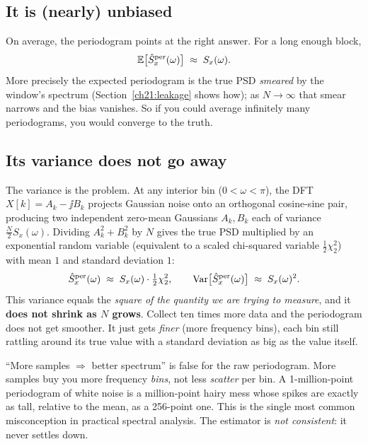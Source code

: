 \subsection{It is (nearly) unbiased}

On average, the periodogram points at the right answer. For a long enough block,
\[
\operatorname{\mathbb{E}}\!\big[\hat{S}^{\text{per}}_x(\omega)\big] \;\approx\; S_x(\omega).
\]
More precisely the expected periodogram is the true PSD \emph{smeared} by the
window's spectrum (Section~\ref{ch21:leakage} shows how); as
$N\to\infty$ that smear narrows and the bias vanishes. So if you could average
infinitely many periodograms, you would converge to the truth.

\subsection{Its variance does not go away}

The variance is the problem. At any interior bin ($0 < \omega < \pi$), the DFT $X[k] = A_k - \jj B_k$ projects Gaussian noise onto an orthogonal cosine-sine pair, producing two independent zero-mean Gaussians $A_k, B_k$ each of variance $\tfrac{N}{2}S_x(\omega)$. Dividing $A_k^2 + B_k^2$ by $N$ gives the true PSD multiplied by an exponential random variable (equivalent to a scaled chi-squared variable $\tfrac12\chi^2_2$) with mean $1$ and standard deviation $1$:
\[
\hat{S}^{\text{per}}_x(\omega) \;\approx\; S_x(\omega)\cdot \tfrac12\chi^2_2,
\qquad \operatorname{Var}\!\big[\hat{S}^{\text{per}}_x(\omega)\big] \;\approx\; S_x(\omega)^2 .
\]
This variance equals the \emph{square of the quantity we are trying
to measure}, and it \textbf{does not shrink as $N$ grows}.
Collect ten times more data and the periodogram does not get smoother. It just
gets \emph{finer} (more frequency bins), each bin still rattling around its true
value with a standard deviation as big as the value itself.

\begin{trapbox}
``More samples $\Rightarrow$ better spectrum'' is false for the raw periodogram.
More samples buy you more frequency \emph{bins}, not less \emph{scatter} per bin.
A 1-million-point periodogram of white noise is a million-point hairy mess whose
spikes are exactly as tall, relative to the mean, as a 256-point one. This is the
single most common misconception in practical spectral analysis. The estimator is
\emph{not consistent}: it never settles down.
\end{trapbox}

